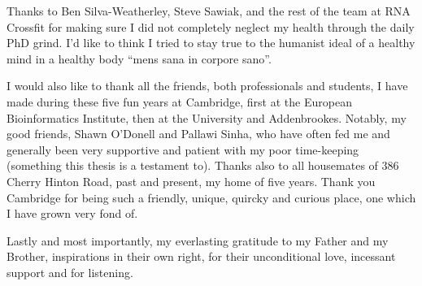 \begin{acknowledgements}
 Thanks to Ben Silva-Weatherley, Steve Sawiak, and the rest of the team at RNA Crossfit for making sure I did not completely neglect my health through the daily PhD grind.
 I'd like to think I tried to stay true to the humanist ideal of a healthy mind in a healthy body ``mens sana in corpore sano''.

 I would also like to thank all the friends, both professionals and students, I have made during these five fun years at Cambridge, first at the European Bioinformatics Institute, then at the University and Addenbrookes.
 Notably, my good friends, Shawn O'Donell and Pallawi Sinha, who have often fed me and generally been very supportive and patient with my poor time-keeping (something this thesis is a testament to).
 Thanks also to all housemates of 386 Cherry Hinton Road, past and present, my home of five years.
 Thank you Cambridge for being such a friendly, unique, quircky and curious place, one which I have grown very fond of.

 Lastly and most importantly, my everlasting gratitude to my Father and my Brother, inspirations in their own right, for their unconditional love, incessant support and for listening.

\end{acknowledgements}
